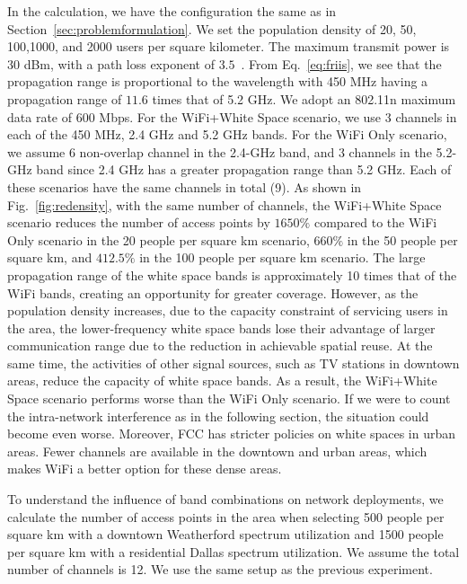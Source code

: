 In the calculation, 
we have the configuration the same as in Section~\ref{sec:problemformulation}.
We set the population density of 20, 50, 100,1000, and 2000 users per square kilometer.
The maximum transmit power is 30 dBm, with a path loss exponent of $3.5$~\cite{meikle2012global}. From Eq.~\ref{eq:friis}, 
we see that the propagation range is proportional to the wavelength with 450 MHz having a propagation 
range of $11.6$ times that of 5.2 GHz. We adopt an 802.11n maximum data rate of 600 Mbps. For the WiFi+White Space 
scenario, we use 3 channels in each of the 450 MHz, 2.4 GHz and 5.2 GHz bands. For the WiFi Only scenario, we assume 
6 non-overlap channel in the 2.4-GHz band, and 3 channels in the 5.2-GHz band since 2.4 GHz has a greater propagation range than 5.2 GHz. 
Each of these scenarios have the same channels in total (9). As shown in Fig.~\ref{fig:redensity}, with the same number 
of channels, the WiFi+White Space scenario reduces the number of access points by $1650\%$ compared to the WiFi Only scenario in the 
20 people per square km scenario, $660\%$ in the 50 people per square km, and $412.5\%$ in the 100 people per square km 
scenario. The large propagation range of the white space bands is approximately 10 times that of the WiFi bands, creating 
an opportunity for greater coverage. However, as the population density increases, due to the capacity constraint of 
servicing users in the area, the lower-frequency white space bands lose their advantage of larger communication range due 
to the reduction in achievable spatial reuse. At the same time, the activities of other signal sources, such as TV stations 
in downtown areas, reduce the capacity of white space bands. As a result, the WiFi+White Space scenario performs worse 
than the WiFi Only scenario. If we were to count the intra-network interference as in the following section, the situation could become 
even worse. Moreover, FCC has stricter policies on white spaces in urban areas. Fewer channels are available in the 
downtown and urban areas, which makes WiFi a better option for these dense areas.

To understand the influence of band combinations on network deployments, we calculate the number of access points in the 
area when selecting 500 people per square km with a downtown Weatherford spectrum utilization and 1500 people per square 
km with a residential Dallas spectrum utilization. We assume the total number of channels is 12. We use the same setup 
as the previous experiment.
 
